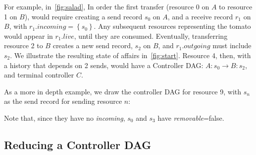 \documentclass[a4paper,USenglish,cleveref, autoref, thm-restate, anonymous]{lipics-v2021}
\newcommand{\cb}[1]{{\left\{{{#1}}\right\}}}
\begin{document}
For example, in~\cref{fig:salad}, In order the first transfer (resource 0 on $A$ to resource 1 on $B$), would require creating a send record $s_0$ on $A$, and a receive record $r_1$ on $B$, with $r_1.incoming=\cb{s_0}$.
Any subsequent resources representing the tomato would appear in $r_1.live$, until they are consumed.
Eventually, transferring resource 2 to $B$ creates a new send record, $s_2$ on $B$, and $r_1.outgoing$ must include $s_2$.
We illustrate the resulting state of affairs in~\cref{fig:start}.
Resource 4, then, with a history that depends on 2 sends, would have a Controller DAG: $A:s_0 \rightarrow B:s_2$, and terminal controller $C$. 


As a more in depth example, we draw the controller DAG for resource 9, with $s_n$ as the send record for sending resource $n$:

\begin{center}
\end{center}
Note that, since they have no \emph{incoming}, $s_0$ and $s_3$ have \emph{removable}=false.


\subsection{Reducing a Controller DAG}
\label{sec:reducing}
\end{document}
